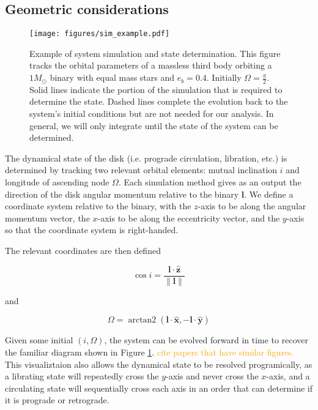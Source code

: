 \documentclass[twocolumn]{aastex631}
\newcommand{\TJ}[1]{\textcolor{orange}{#1}}
\DeclareMathOperator{\arctantwo}{arctan2}
\begin{document}
\subsection{Geometric considerations}
\label{subsec:setup}

\begin{figure}
    \begin{centering}
        \texttt{[image: figures/sim\_example.pdf]}
        \caption{Example of system simulation and state determination. This figure tracks the orbital parameters
        of a massless third body orbiting a $1 M_\odot$ binary with equal mass stars and $e_b = 0.4$.
        Initially $\Omega = \frac{\pi}{2}$.
        Solid lines indicate
        the portion of the simulation that is required to determine the state. Dashed lines complete the evolution back to the system's
        initial conditions but are not needed for our analysis. In general, we will only integrate until the state of the system can be
        determined.}
        \label{fig:sim_example}
    \end{centering}
\end{figure}

The dynamical state of the disk (i.e. prograde circulation, libration, etc.) is determined by tracking two relevant orbital elements:
mutual inclination $i$ and longitude of ascending node $\Omega$. Each simulation method gives as an output the direction of the disk angular momentum relative to
the binary $\bm{l}$. We define a coordinate system relative to the binary, with the $z$-axis to be along the
angular momentum vector, the $x$-axis to be along the eccentricity vector, and the
$y$-axis so that the coordinate system is right-handed.

The relevant coordinates are then defined

\begin{equation}
    \cos{i} = \frac{\bm{l} \cdot \hat{\bm{z}}}{\|\bm l\|}
    \label{eq:inclination}
\end{equation}

and

\begin{equation}
    \Omega = \arctantwo (\bm{l} \cdot \hat{\bm{x}}, -\bm{l} \cdot \hat{\bm{y}})
    \label{eq:omega}
\end{equation}

Given some initial $(i,\Omega)$, the system can be evolved forward in time to recover the familiar diagram shown in Figure \ref{fig:sim_example}.
\TJ{cite papers that have similar figures.}
This visualiztaion also allows the dynamical state to be resolved programically, as a librating state will repeatedly cross the $y$-axis and never
cross the $x$-axis, and a circulating state will sequentially cross each axis in an order that can determine if it is prograde or retrograde.
\end{document}
